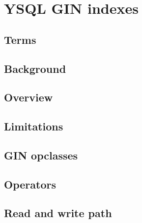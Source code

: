 \documentclass[11pt]{article}
\begin{document}
\hypertarget{ysql-gin-indexes}{%
\section{YSQL GIN indexes}\label{ysql-gin-indexes}}

\hypertarget{terms}{%
\subsection{Terms}\label{terms}}


\hypertarget{background}{%
\subsection{Background}\label{background}}


\hypertarget{overview}{%
\subsection{Overview}\label{overview}}


\hypertarget{limitations}{%
\subsection{Limitations}\label{limitations}}


\hypertarget{gin-opclasses}{%
\subsection{GIN opclasses}\label{gin-opclasses}}


\hypertarget{operators}{%
\subsection{Operators}\label{operators}}


\hypertarget{read-and-write-path}{%
\subsection{Read and write path}\label{read-and-write-path}}
\end{document}
